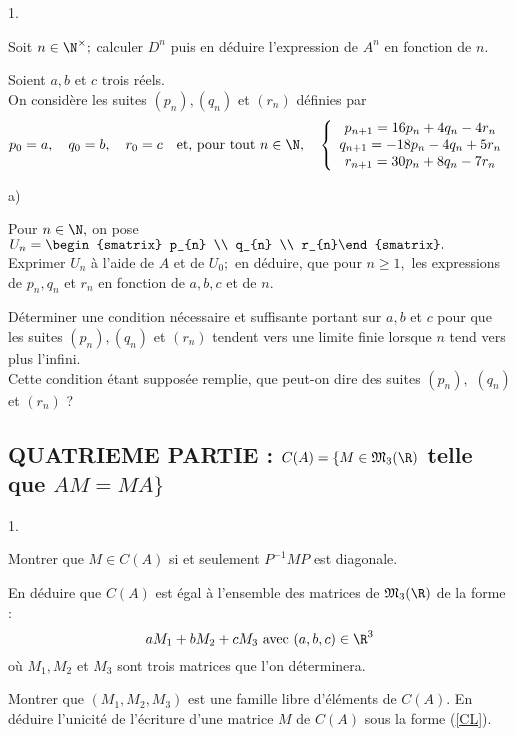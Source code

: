 \documentclass[11pt]{article}%
\begin{document}
\begin{noliste}{1.}
 \setlength{\itemsep}{4mm}
\item Soit $n\in \N^{\times };$ calculer $D^{n}$ puis en déduire
l'expression de $A^{n}$ en fonction de $n.$

\item Soient $a,b$ et $c$ trois réels.\\
On considère les suites $(p_{n}),(q_{n})$ et $(r_{n})$ définies par 
\[
p_{0} = a,\quad q_{0} = b,\quad r_{0} = c\quad \text{et, pour tout
}n\in \N,\quad \left\{ 
\begin{array}{c}
p_{n + 1} = 16p_{n} + 4q_{n}-4r_{n} \\
q_{n + 1} = -18p_{n}-4q_{n} + 5r_{n} \\
r_{n + 1} = 30p_{n} + 8q_{n}-7r_{n}
\end{array}
\right.
\]

\begin{noliste}{a)}
 \setlength{\itemsep}{2mm}
\item Pour $n\in \N,$ on pose $U_{n} = 
\begin{smatrix}
p_{n} \\
q_{n} \\
r_{n}\end{smatrix}.$\\
Exprimer $U_{n}$ à l'aide de $A$ et de $U_{0};$ en déduire, que pour
$n\geq 1,$ les expressions de $p_{n},q_{n}$ et $r_{n}$ en fonction de
$a,b,c$ et de $n.$

\item Déterminer une condition nécessaire et suffisante portant sur
$a,b$ et 
$c$ pour que les suites $(p_{n}),(q_{n})$ et $(r_{n})$ tendent vers une
limite finie lorsque $n$ tend vers plus l'infini.\\
Cette condition étant supposée remplie, que peut-on dire des suites
$(p_{n}), $ $(q_{n})$ et $(r_{n})$ ?
\end{noliste}
\end{noliste}

\subsection*{QUATRIEME PARTIE : $C(A) = \{M\in \mathfrak{M}_{3}(\R)$
telle que $AM = MA\}$}

\begin{noliste}{1.}
 \setlength{\itemsep}{4mm}
\item Montrer que $M\in C(A)$ si et seulement $P^{-1}MP$ est diagonale.

\item En déduire que $C(A)$ est égal à l'ensemble des matrices de
$\mathfrak{M}_{3}(\R)$ de la forme : 
\begin{equation}
aM_{1} + bM_{2} + cM_{3}\text{ avec }(a,b,c)\in \R^{3} \label{CL}
\end{equation}
où $M_{1},M_{2}$ et $M_{3}$ sont trois matrices que l'on déterminera.

\item Montrer que $(M_{1},M_{2},M_{3})$ est une famille libre
d'éléments de $C(A).$ En déduire l'unicité de l'écriture d'une matrice
$M$ de $C(A)$ sous
la forme (\ref{CL}).
\end{noliste}

\label{fin}
\end{document}

